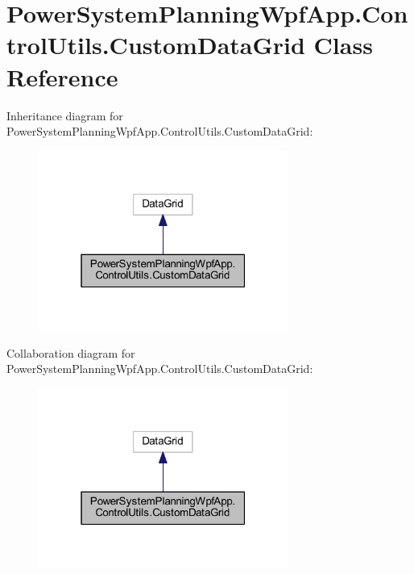 \hypertarget{class_power_system_planning_wpf_app_1_1_control_utils_1_1_custom_data_grid}{}\section{Power\+System\+Planning\+Wpf\+App.\+Control\+Utils.\+Custom\+Data\+Grid Class Reference}
\label{class_power_system_planning_wpf_app_1_1_control_utils_1_1_custom_data_grid}


Inheritance diagram for Power\+System\+Planning\+Wpf\+App.\+Control\+Utils.\+Custom\+Data\+Grid\+:\nopagebreak
\begin{figure}[H]
\begin{center}
\leavevmode
\includegraphics[width=232pt]{class_power_system_planning_wpf_app_1_1_control_utils_1_1_custom_data_grid__inherit__graph}
\end{center}
\end{figure}


Collaboration diagram for Power\+System\+Planning\+Wpf\+App.\+Control\+Utils.\+Custom\+Data\+Grid\+:\nopagebreak
\begin{figure}[H]
\begin{center}
\leavevmode
\includegraphics[width=232pt]{class_power_system_planning_wpf_app_1_1_control_utils_1_1_custom_data_grid__coll__graph}
\end{center}
\end{figure}
